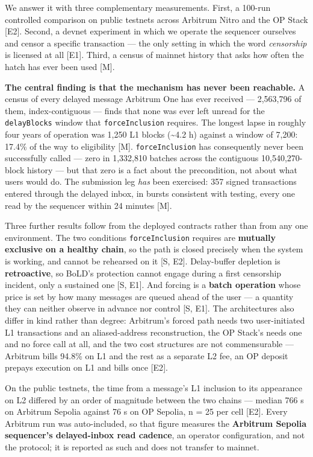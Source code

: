 \documentclass[conference]{IEEEtran}
\renewcommand{\_}{\textunderscore\allowbreak}
\begin{document}
We answer it with three complementary measurements. First, a 100-run
controlled comparison on public testnets across Arbitrum Nitro and the
OP Stack {[}E2{]}. Second, a devnet experiment in which we operate the
sequencer ourselves and censor a specific transaction --- the only
setting in which the word \emph{censorship} is licensed at all {[}E1{]}.
Third, a census of mainnet history that asks how often the hatch has
ever been used {[}M{]}.

\textbf{The central finding is that the mechanism has never been
reachable.} A census of every delayed message Arbitrum One has ever
received --- 2,563,796 of them, index-contiguous --- finds that none was
ever left unread for the \texttt{delayBlocks} window that
\texttt{forceInclusion} requires. The longest lapse in roughly four
years of operation was 1,250 L1 blocks (\textasciitilde4.2 h) against a
window of 7,200: 17.4\% of the way to eligibility {[}M{]}.
\texttt{forceInclusion} has consequently never been successfully called
--- zero in 1,332,810 batches across the contiguous 10,540,270-block
history --- but that zero is a fact about the precondition, not about
what users would do. The submission leg \emph{has} been exercised: 357
signed transactions entered through the delayed inbox, in bursts
consistent with testing, every one read by the sequencer within 24
minutes {[}M{]}.

Three further results follow from the deployed contracts rather than
from any one environment. The two conditions \texttt{forceInclusion}
requires are \textbf{mutually exclusive on a healthy chain}, so the path
is closed precisely when the system is working, and cannot be rehearsed
on it {[}S, E2{]}. Delay-buffer depletion is \textbf{retroactive}, so
BoLD's protection cannot engage during a first censorship incident, only
a sustained one {[}S, E1{]}. And forcing is a \textbf{batch operation}
whose price is set by how many messages are queued ahead of the user ---
a quantity they can neither observe in advance nor control {[}S, E1{]}.
The architectures also differ in kind rather than degree: Arbitrum's
forced path needs two user-initiated L1 transactions and an
aliased-address reconstruction, the OP Stack's needs one and no force
call at all, and the two cost structures are not commensurable ---
Arbitrum bills 94.8\% on L1 and the rest as a separate L2 fee, an OP
deposit prepays execution on L1 and bills once {[}E2{]}.

On the public testnets, the time from a message's L1 inclusion to its
appearance on L2 differed by an order of magnitude between the two
chains --- median 766 s on Arbitrum Sepolia against 76 s on OP Sepolia,
n = 25 per cell {[}E2{]}. Every Arbitrum run was auto-included, so that
figure measures the \textbf{Arbitrum Sepolia sequencer's delayed-inbox
read cadence}, an operator configuration, and not the protocol; it is
reported as such and does not transfer to mainnet.
\end{document}
